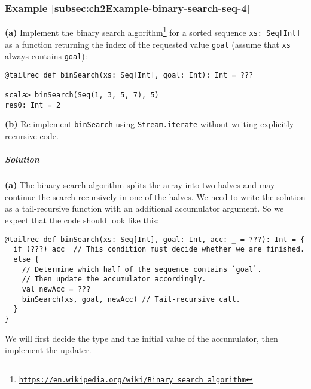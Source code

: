 \subsubsection{Example \label{subsec:ch2Example-binary-search-seq-4}\ref{subsec:ch2Example-binary-search-seq-4}}

\textbf{(a)} Implement the binary search algorithm\footnote{\texttt{\href{https://en.wikipedia.org/wiki/Binary_search_algorithm}{https://en.wikipedia.org/wiki/Binary\_search\_algorithm}}}
for a sorted sequence \lstinline!xs: Seq[Int]! as a function returning
the index of the requested value \lstinline!goal! (assume that \lstinline!xs!
always contains \lstinline!goal!):
\begin{lstlisting}
@tailrec def binSearch(xs: Seq[Int], goal: Int): Int = ???

scala> binSearch(Seq(1, 3, 5, 7), 5)
res0: Int = 2
\end{lstlisting}

\textbf{(b)} Re-implement \lstinline!binSearch! using \lstinline!Stream.iterate!
without writing explicitly recursive code.

\subparagraph{Solution}

\textbf{(a)} The binary search algorithm splits the array into two
halves and may continue the search recursively in one of the halves.
We need to write the solution as a tail-recursive function with an
additional accumulator argument. So we expect that the code should
look like this:
\begin{lstlisting}
@tailrec def binSearch(xs: Seq[Int], goal: Int, acc: _ = ???): Int = {
  if (???) acc  // This condition must decide whether we are finished.
  else {
    // Determine which half of the sequence contains `goal`.
    // Then update the accumulator accordingly.
    val newAcc = ???
    binSearch(xs, goal, newAcc) // Tail-recursive call.
  }
}
\end{lstlisting}
We will first decide the type and the initial value of the accumulator,
then implement the updater.

